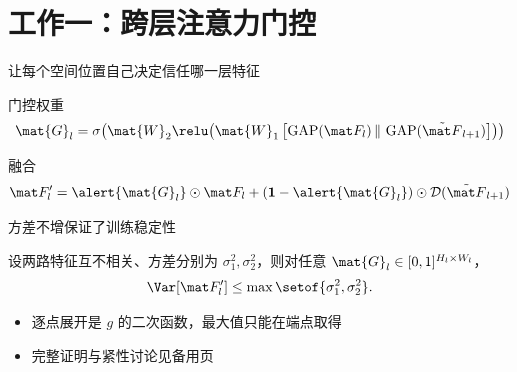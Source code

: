\section{工作一：跨层注意力门控}

\begin{frame}{让每个空间位置自己决定信任哪一层特征}
  \begin{block}{门控权重}
    \vspace{-0.6em}
    \begin{equation*}
      \mat{G}_l = \sigma\!\left(
        \mat{W}_2 \relu\!\left(
          \mat{W}_1 \left[ \operatorname{GAP}(\featmap_l) \,\Vert\,
                           \operatorname{GAP}(\tilde{\featmap}_{l+1}) \right]
        \right)\right)
    \end{equation*}
  \end{block}
  \vspace{0.4em}
  \begin{block}{融合}
    \vspace{-0.6em}
    \begin{equation*}
      \featmap_l' = \alert{\mat{G}_l} \odot \featmap_l
                  + (\mathbf{1} - \alert{\mat{G}_l}) \odot
                    \mathcal{D}(\tilde{\featmap}_{l+1})
    \end{equation*}
  \end{block}
\end{frame}

\begin{frame}{方差不增保证了训练稳定性}
  \begin{theorem}[方差不增]
    设两路特征互不相关、方差分别为 $\sigma_1^2,\sigma_2^2$，则对任意
    $\mat{G}_l \in [0,1]^{H_l\times W_l}$，
    \begin{equation*}
      \Var\!\left[\featmap_l'\right] \le \max\setof{\sigma_1^2,\sigma_2^2}.
    \end{equation*}
  \end{theorem}
  \vspace{0.6em}
  \begin{itemize}
    \item 逐点展开是 $g$ 的二次函数，最大值只能在端点取得
    \item 完整证明与紧性讨论见备用页
  \end{itemize}

\end{frame}


